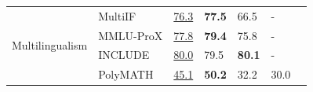 \begin{table}[t]
\begin{tabular}{lllllll}
\midrule
\multirow{4}{*}{Multilingualism}       & MultiIF                & \underline{76.3}                       & \textbf{77.5}                     & 66.5               & -                           \\
                                       & MMLU-ProX              & \underline{77.8}                       & \textbf{79.4}                     & 75.8               & -                           \\
                                       & INCLUDE                & \underline{80.0}                       & 79.5                     & \textbf{80.1}               & -                           \\
                                       & PolyMATH               & \underline{45.1}          & \textbf{50.2}  & 32.2               & 30.0            \\              
\bottomrule
\end{tabular}
\label{tab: exp_qwen3_vl_235b_a22b_nothinking}
\end{table}

